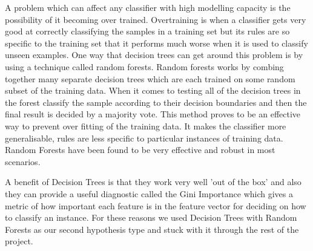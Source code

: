 \documentclass[12pt]{IIBproject}
\begin{document}
A problem which can affect any classifier with high modelling capacity is the possibility of it becoming over trained. Overtraining is when a classifier gets very good at correctly classifying the samples in a training set but its rules are so specific to the training set that it performs much worse when it is used to classify unseen examples. One way that decision trees can get around this problem is by using a technique called random forests. Random forests works by combing together many separate decision trees which are each trained on some random subset of the training data. When it comes to testing all of the decision trees in the forest classify the sample according to their decision boundaries and then the final result is decided by a majority vote. This method proves to be an effective way to prevent over fitting of the training data. It makes the classifier more generalisable, rules are less specific to particular instances of training data. Random Forests have been found to be very effective and robust in most scenarios\cite{breiman2001random}. 

A benefit of Decision Trees is that they work very well 'out of the box' and also they can provide a useful diagnostic called the Gini Importance\cite{menze2009comparison} which gives a metric of how important each feature is in the feature vector for deciding on how to classify an instance. For these reasons we used Decision Trees with Random Forests as our second hypothesis type and stuck with it through the rest of the project.
\end{document}
